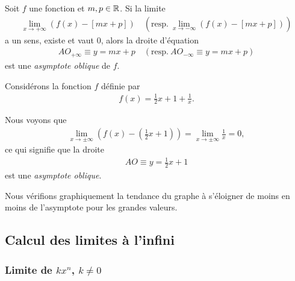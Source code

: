 \documentclass[main.tex]{subfiles}
\begin{document}
\begin{definition}

    Soit $f$ une fonction et $m, p \in \mathbb{R}$.
    Si la limite
    \begin{align*}
        \lim_{x \to +\infty} \left(f(x) - [mx + p]\right)
        \quad \left(\text{resp.}\ \lim_{x \to -\infty} \left(f(x) - [mx + p]\right)\right)
    \end{align*}
    a un sens, existe et vaut $0$,
    alors la droite d'équation
    \begin{align}
        AO_{+\infty} \equiv y = mx + p
        \quad \left(\text{resp.}\ AO_{-\infty} \equiv y = mx + p\right)
    \end{align}
    est une \emph{asymptote oblique} de $f$.
\end{definition}

\begin{example}

    Considérons la fonction $f$ définie par
    \begin{align}
        f(x) = \frac 1 2 x + 1 + \frac 1 x.
    \end{align}

    Nous voyons que
    \begin{align}
        \lim_{x \to \pm \infty} (f(x) - (\frac 1 2 x + 1)) = \lim_{x \to \pm \infty} \frac 1 x = 0,
    \end{align}
    ce qui signifie que la droite
    \begin{align}
        AO \equiv y = \frac 1 2 x + 1
    \end{align}
    est une \emph{asymptote oblique}.

    Nous vérifions graphiquement la tendance du graphe à s'éloigner de moins en moins de l'asymptote pour les grandes valeurs.
    \begin{center}
        \begin{plot}{0.25}{-12}{-12}{12}{12}
        \end{plot}
    \end{center}
\end{example}

\subsection{Calcul des limites à l'infini}

\subsubsection{Limite de $k x^n$, $k \neq 0$}
\end{document}
